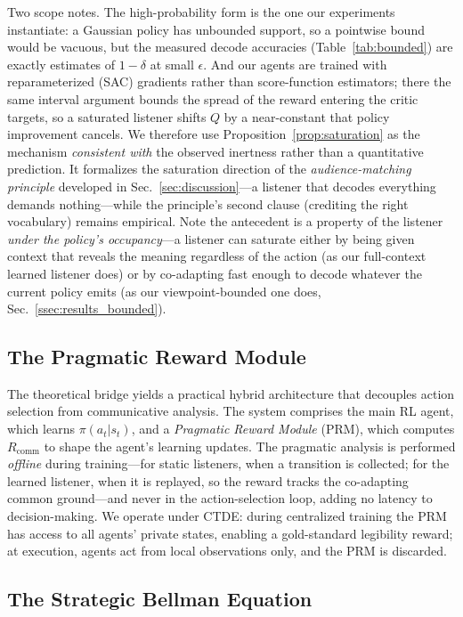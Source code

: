 \documentclass{article}
\newcommand{\Rcomm}{R_{\text{comm}}}
\begin{document}
Two scope notes. The high-probability form is the one our experiments instantiate: a Gaussian policy has unbounded support, so a pointwise bound would be vacuous, but the measured decode accuracies (Table~\ref{tab:bounded}) are exactly estimates of $1-\delta$ at small $\epsilon$. And our agents are trained with reparameterized (SAC) gradients rather than score-function estimators; there the same interval argument bounds the spread of the reward entering the critic targets, so a saturated listener shifts $Q$ by a near-constant that policy improvement cancels. We therefore use Proposition~\ref{prop:saturation} as the mechanism \emph{consistent with} the observed inertness rather than a quantitative prediction. It formalizes the saturation direction of the \emph{audience-matching principle} developed in Sec.~\ref{sec:discussion}---a listener that decodes everything demands nothing---while the principle's second clause (crediting the right vocabulary) remains empirical. Note the antecedent is a property of the listener \emph{under the policy's occupancy}---a listener can saturate either by being given context that reveals the meaning regardless of the action (as our full-context learned listener does) or by co-adapting fast enough to decode whatever the current policy emits (as our viewpoint-bounded one does, Sec.~\ref{ssec:results_bounded}).

\subsection{The Pragmatic Reward Module}
\label{ssec:architecture}

The theoretical bridge yields a practical hybrid architecture that decouples action selection from communicative analysis. The system comprises the main RL agent, which learns $\pi(a_t|s_t)$, and a \emph{Pragmatic Reward Module} (PRM), which computes $\Rcomm$ to shape the agent's learning updates. The pragmatic analysis is performed \emph{offline} during training---for static listeners, when a transition is collected; for the learned listener, when it is replayed, so the reward tracks the co-adapting common ground---and never in the action-selection loop, adding no latency to decision-making. We operate under CTDE: during centralized training the PRM has access to all agents' private states, enabling a gold-standard legibility reward; at execution, agents act from local observations only, and the PRM is discarded.

\subsection{The Strategic Bellman Equation}
\label{ssec:bellman}
\end{document}
